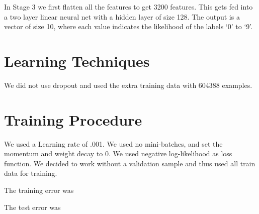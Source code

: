 \documentclass[10pt,letterpaper]{article}
\begin{document}
In Stage 3 we first flatten all the features to get 3200 features. This
gets fed into a two layer linear neural net with a hidden layer of size
128. The output is a vector of size 10, where each value indicates the
likelihood of the labels `0' to `9'.

\section{Learning Techniques}\label{learning-techniques}


We did not use dropout and used the extra training data with 604388
examples.

\section{Training Procedure}\label{training-procedure}



We used a Learning rate of .001. We used no mini-batches, and set the
momentum and weight decay to 0. We used negative log-likelihood as loss
function. We decided to work without a validation sample and thus used
all train data for training.

The training error was

The test error was
\end{document}

